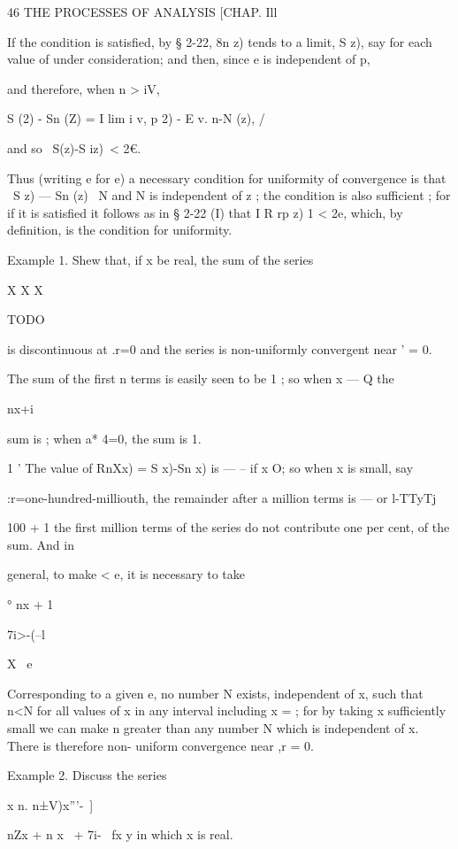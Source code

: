 46 THE PROCESSES OF ANALYSIS [CHAP. Ill

If the condition is satisfied, by § 2-22, 8n z) tends to a limit, S
z), say for each value of under consideration; and then, since e is
independent of p,

and therefore, when n > iV,

S (2) - Sn (Z) = I lim i v, p 2) - E v. n-N (z), /

and so \ S(z)-S iz)\ < 2€.

Thus (writing e for e) a necessary condition for uniformity of
convergence is that \ S z) — Sn (z) \ < e, whenever n>N and N is
independent of z ; the condition is also sufficient ; for if it is
satisfied it follows as in § 2-22 (I) that I R rp z) 1 < 2e, which, by
definition, is the condition for uniformity.

Example 1. Shew that, if x be real, the sum of the series

X X X

TODO

is discontinuous at .r=0 and the series is non-uniformly convergent
near ' = 0.

The sum of the first n terms is easily seen to be 1 ; so when x — Q
the

nx+i

sum is ; when a* 4=0, the sum is 1.

1 ' The value of RnXx) = S x)-Sn x) is — -- if x O; so when x is
small, say

:r=one-hundred-milliouth, the remainder after a million terms is — or
l-TTyTj

100 + 1 the first million terms of the series do not contribute one
per cent, of the sum. And in

general, to make < e, it is necessary to take

° nx + 1

7i>-(--l

X \ e

Corresponding to a given e, no number N exists, independent of x, such
that n<N for all values of x in any interval including x = ; for by
taking x sufficiently small we can make n greater than any number N
which is independent of x. There is therefore non- uniform convergence
near ,r = 0.

Example 2. Discuss the series

x n. n±V)x'''-\ ]



nZx + n x \ + 7i- \ fx y in which x is real.

